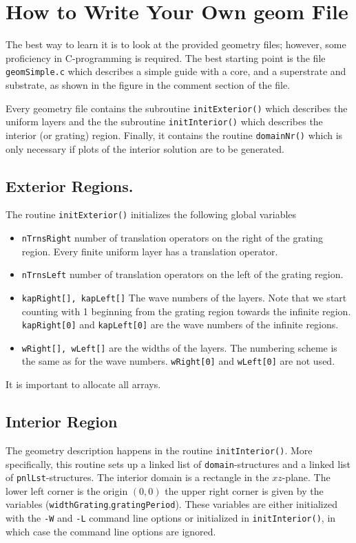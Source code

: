 \documentclass{article}
\begin{document}
\section{How to Write Your Own geom File} 
The best way to learn it is to look at the provided geometry files;
however, some proficiency in C-programming is required. The best
starting point is the file \texttt{geomSimple.c} which describes a
simple guide with a core, and a superstrate and substrate, as shown in
the figure in the comment section of the file.

Every geometry file contains the subroutine \texttt{initExterior()}
which describes the uniform layers and the the subroutine
\texttt{initInterior()} which describes the interior (or grating)
region. Finally, it contains the routine \texttt{domainNr()} which is
only necessary if plots of the interior solution are to be generated.

\subsection{Exterior Regions.} The routine \texttt{initExterior()}
initializes the following global variables 
\begin{itemize}
\item[] \texttt{nTrnsRight} number of
translation operators on the right of the grating region. Every finite
uniform layer has a translation operator.
\item[] \texttt{nTrnsLeft}  number of
translation operators on the left of the grating region.
\item[] \texttt{kapRight[], kapLeft[]} The wave numbers of the
  layers. Note that we start counting with 1 beginning from the
  grating region towards the infinite region.  \texttt{kapRight[0]} and
  \texttt{kapLeft[0]} are the wave numbers of the infinite regions.
\item[] \texttt{wRight[], wLeft[]} are the widths of the 
  layers. The numbering scheme is the same as for the wave numbers. 
  \texttt{wRight[0]} and \texttt{wLeft[0]} are not used.
\end{itemize} 
It is important to allocate all arrays. 


\subsection{Interior Region} 
The geometry description happens in the
routine \texttt{initInterior()}. More specifically, this routine sets up
a linked list of \texttt{domain}-structures and a linked list of
\texttt{pnlLst}-structures.  
The interior domain is a rectangle in the $xz$-plane. The lower left
corner is the origin $(0,0)$ the upper right corner is given by the
variables (\texttt{widthGrating},\texttt{gratingPeriod}). These
variables are either initialized with the \texttt{-W} and \texttt{-L}
command line options or initialized in \texttt{initInterior()}, in
which case the command line options are ignored. 
\end{document}
